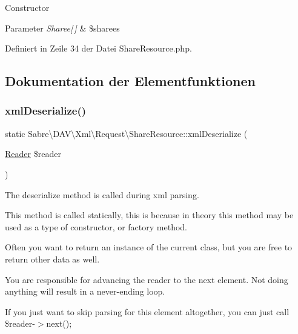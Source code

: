 Constructor


\begin{DoxyParams}{Parameter}
{\em Sharee\mbox{[}$\,$\mbox{]}} & \$sharees \\
\hline
\end{DoxyParams}


Definiert in Zeile 34 der Datei Share\+Resource.\+php.



\subsection{Dokumentation der Elementfunktionen}
\mbox{\label{class_sabre_1_1_d_a_v_1_1_xml_1_1_request_1_1_share_resource_aee1943104644bf11bc6fe23121cde9db}} 
\subsubsection{\texorpdfstring{xml\+Deserialize()}{xmlDeserialize()}}
{\footnotesize\ttfamily static Sabre\textbackslash{}\+D\+A\+V\textbackslash{}\+Xml\textbackslash{}\+Request\textbackslash{}\+Share\+Resource\+::xml\+Deserialize (\begin{DoxyParamCaption}\item[{\mbox{\hyperlink{class_sabre_1_1_xml_1_1_reader}{Reader}}}]{\$reader }\end{DoxyParamCaption})\hspace{0.3cm}{\ttfamily [static]}}

The deserialize method is called during xml parsing.

This method is called statically, this is because in theory this method may be used as a type of constructor, or factory method.

Often you want to return an instance of the current class, but you are free to return other data as well.

You are responsible for advancing the reader to the next element. Not doing anything will result in a never-\/ending loop.

If you just want to skip parsing for this element altogether, you can just call \$reader-\/$>$next();


